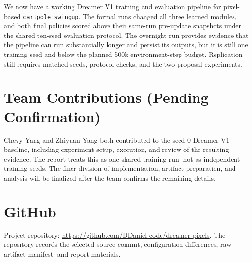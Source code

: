\documentclass{article}
\begin{document}
We now have a working Dreamer V1 training and evaluation pipeline for pixel-based \texttt{cartpole\_swingup}. The formal runs changed all three learned modules, and both final policies scored above their same-run pre-update snapshots under the shared ten-seed evaluation protocol. The overnight run provides evidence that the pipeline can run substantially longer and persist its outputs, but it is still one training seed and below the planned 500k environment-step budget. Replication still requires matched seeds, protocol checks, and the two proposal experiments.

\section*{Team Contributions (Pending Confirmation)}

Chevy Yang and Zhiyuan Yang both contributed to the seed-0 Dreamer V1 baseline, including experiment setup, execution, and review of the resulting evidence. The report treats this as one shared training run, not as independent training seeds. The finer division of implementation, artifact preparation, and analysis will be finalized after the team confirms the remaining details.

\section*{GitHub}

Project repository: \url{https://github.com/DDaniel-code/dreamer-pixels}. The repository records the selected source commit, configuration differences, raw-artifact manifest, and report materials.

\begingroup
\small


\endgroup
\end{document}
